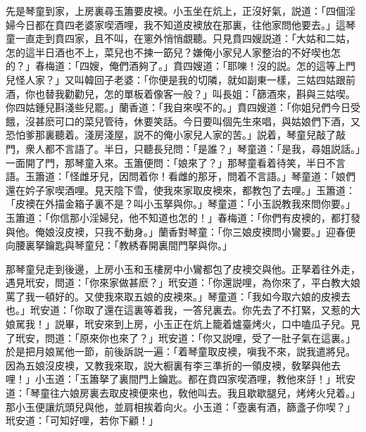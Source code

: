 先是琴童到家，上房裏尋玉簫要皮襖。小玉坐在炕上，正沒好氣，説道：「四個淫婦今日都在賁四老婆家喫酒哩，我不知道皮襖放在那裏，往他家問他要去。」這琴童一直走到賁四家，且不叫，在窻外悄悄覷聽。只見賁四嫂説道：「大姑和二姑，怎的這半日酒也不上，菜兒也不揀一筯兒？嫌俺小家兒人家整治的不好喫也怎的？」春梅道：「四嫂，俺們酒夠了。」賁四嫂道：「耶嚛！沒的説。怎的這等上門兒怪人家？」又叫韓回子老婆：「你便是我的切隣，就如副東一樣，三姑四姑跟前酒，你也替我勸勸兒，怎的單板着像客一般？」叫長姐：「篩酒來，斟與三姑喫。你四姑鍾兒斟淺些兒罷。」蘭香道：「我自來喫不的。」賁四嫂道：「你姐兒們今日受餓，沒甚麽可口的菜兒管待，休要笑話。今日要叫個先生來唱，與姑娘們下酒，又恐怕爹那裏聽着。淺房淺屋，説不的俺小家兒人家的苦。」説着，琴童兒敲了敲門，衆人都不言語了。半日，只聽長兒問：「是誰？」琴童道：「是我，尋姐説話。」一面開了門，那琴童入來。玉簫便問：「娘來了？」那琴童看着待笑，半日不言語。玉簫道：「怪雌牙兒，因問着你！看雌的那牙，問着不言語。」琴童道：「娘們還在妗子家喫酒哩。見天陰下雪，使我來家取皮襖來，都教包了去哩。」玉簫道：「皮襖在外描金箱子裏不是？叫小玉拏與你。」琴童道：「小玉説教我來問你要。」玉簫道：「你信那小淫婦兒，他不知道也怎的！」春梅道：「你們有皮襖的，都打發與他。俺娘沒皮襖，只我不動身。」蘭香對琴童：「你三娘皮襖問小鸞要。」迎春便向腰裏拏鑰匙與琴童兒：「教綉春開裏間門拏與你。」

那琴童兒走到後邊，上房小玉和玉樓房中小鸞都包了皮襖交與他。正拏着往外走，遇見玳安，問道：「你來家做甚麽？」玳安道：「你還説哩，為你來了，平白教大娘罵了我一頓好的。又使我來取五娘的皮襖來。」琴童道：「我如今取六娘的皮襖去也。」玳安道：「你取了還在這裏等着我，一答兒裏去。你先去了不打緊，又惹的大娘駡我！」説畢，玳安來到上房，小玉正在炕上籠着爐臺烤火，口中嗑瓜子兒。見了玳安，問道：「原來你也來了？」玳安道：「你又説哩，受了一肚子氣在這裏。」於是把月娘駡他一節，前後訴説一遍：「着琴童取皮襖，嗔我不來，説我遣將兒。因為五娘沒皮襖，又教我來取，説大橱裏有李三準折的一領皮襖，敎拏與他去哩！」小玉道：「玉簫拏了裏間門上鑰匙。都在賁四家喫酒哩，教他來㧱！」玳安道：「琴童往六娘房裏去取皮襖便來也，敎他叫去。我且歇歇腿兒，烤烤火兒着。」那小玉便讓炕頭兒與他，並肩相挨着向火。小玉道：「壺裏有酒，篩盞子你喫？」玳安道：「可知好哩，若你下顧！」

